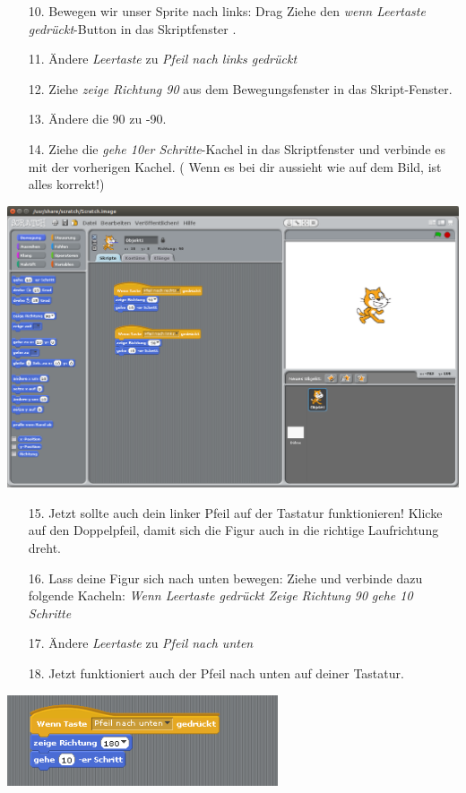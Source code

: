 \begin{itemize}

\item[10.] Bewegen wir unser Sprite nach links: Drag Ziehe den \textit{wenn Leertaste gedrückt}-Button in das Skriptfenster .
\item[11.] Ändere \textit{Leertaste} zu \textit{Pfeil nach links gedrückt}
\item[12.] Ziehe \textit{zeige Richtung 90} aus dem Bewegungsfenster in das Skript-Fenster.
\item[13.] Ändere die 90 zu -90.
\item[14.] Ziehe die \textit{gehe 10er Schritte}-Kachel in das Skriptfenster und verbinde es mit der vorherigen Kachel.
( Wenn es bei dir aussieht wie auf dem Bild, ist alles korrekt!)
\end{itemize}
\includegraphics[width=\textwidth]{images/aufgabe1_links.png}

\begin{itemize}
\item[15.] Jetzt sollte auch dein linker Pfeil auf der Tastatur funktionieren! Klicke auf den Doppelpfeil, damit sich die Figur auch in die richtige Laufrichtung dreht. 
\item[16.] Lass deine Figur sich nach unten bewegen: Ziehe und verbinde dazu folgende Kacheln:
\subitem \textit{Wenn Leertaste gedrückt}
\subitem \textit{Zeige Richtung 90}
\subitem \textit{gehe 10 Schritte}
\item[17.] Ändere \textit{Leertaste} zu \textit{Pfeil nach unten}
\item[18.] Jetzt funktioniert auch der Pfeil nach unten auf deiner Tastatur. 
\end{itemize}
\includegraphics[width=0.6\textwidth]{images/aufgabe1_unten.png}

